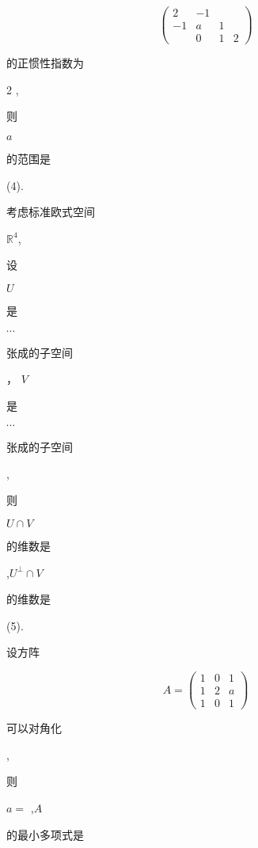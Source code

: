 \documentclass[10pt]{article}
\begin{document}
$$
\left(\begin{array}{cccc}
2 & -1 & & \\
-1 & a & 1 & \\
& 0 & 1 & 2
\end{array}\right)
$$
\begin{CJK}{UTF8}{mj}的正惯性指数为\end{CJK} 2 , \begin{CJK}{UTF8}{mj}则\end{CJK} $a$ \begin{CJK}{UTF8}{mj}的范围是\end{CJK}

(4). \begin{CJK}{UTF8}{mj}考虑标准欧式空间\end{CJK} $\mathbb{R}^{4}$, \begin{CJK}{UTF8}{mj}设\end{CJK} $U$ \begin{CJK}{UTF8}{mj}是\end{CJK} $\cdots$ \begin{CJK}{UTF8}{mj}张成的子空间\end{CJK}， $V$ \begin{CJK}{UTF8}{mj}是\end{CJK} $\cdots$ \begin{CJK}{UTF8}{mj}张成的子空间\end{CJK}, \begin{CJK}{UTF8}{mj}则\end{CJK} $U \cap V$ \begin{CJK}{UTF8}{mj}的维数是\end{CJK} ,$U^{\perp} \cap V$ \begin{CJK}{UTF8}{mj}的维数是\end{CJK}

(5). \begin{CJK}{UTF8}{mj}设方阵\end{CJK}
$$
A=\left(\begin{array}{lll}
1 & 0 & 1 \\
1 & 2 & a \\
1 & 0 & 1
\end{array}\right)
$$
\begin{CJK}{UTF8}{mj}可以对角化\end{CJK}, \begin{CJK}{UTF8}{mj}则\end{CJK} $a=$ ,$A$ \begin{CJK}{UTF8}{mj}的最小多项式是\end{CJK}
\end{document}
